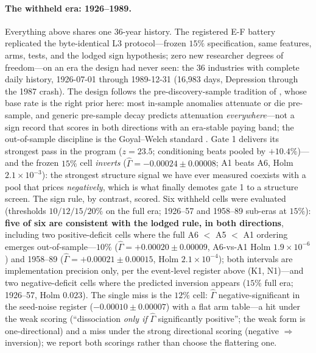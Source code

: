 \documentclass{article}
\begin{document}
\paragraph{The withheld era: 1926--1989.} Everything above shares one
36-year history. The registered E-F battery replicated the
byte-identical L3 protocol---frozen $15\%$ specification, same
features, arms, tests, and the lodged sign hypothesis; zero new
researcher degrees of freedom---on an era the design had never seen:
the 36 industries with complete daily history, 1926-07-01 through
1989-12-31 (16{,}983 days, Depression through the 1987 crash). The
design follows the pre-discovery-sample tradition of
\citet{linnainmaa2018history}, whose base rate is the right prior
here: most in-sample anomalies attenuate or die pre-sample, and
generic pre-sample decay predicts attenuation \emph{everywhere}---not
a sign record that scores in both directions with an era-stable
paying band; the out-of-sample discipline is
the Goyal--Welch standard \citep{goyal2008comprehensive,
mclean2016does}. Gate 1
delivers its strongest pass in the program ($z = 23.5$; conditioning
beats pooled by $+10.4\%$)---and the frozen $15\%$ cell
\emph{inverts} ($\hat\Gamma = -0.00024 \pm 0.00008$; A1 beats A6,
Holm $2.1\times10^{-3}$): the strongest structure signal we have ever
measured coexists with a pool that prices \emph{negatively}, which is
what finally demotes gate 1 to a structure screen. The sign rule, by
contrast, scored. Six withheld cells were evaluated (thresholds
$10/12/15/20\%$ on the full era; 1926--57 and 1958--89 sub-eras at
$15\%$): \textbf{five of six are consistent with the lodged rule, in
both directions}, including two positive-deficit cells where the full
A6 $<$ A5 $<$ A1 ordering emerges out-of-sample---$10\%$
($\hat\Gamma = +0.00020 \pm 0.00009$, A6-vs-A1 Holm
$1.9\times10^{-6}$) and 1958--89 ($\hat\Gamma = +0.00021 \pm 0.00015$,
Holm $2.1\times10^{-4}$); both intervals are implementation
precision only, per the event-level register above (K1,
N1)---and two negative-deficit cells where the
predicted inversion appears ($15\%$ full era; 1926--57, Holm $0.023$).
The single miss is the $12\%$ cell: $\hat\Gamma$ negative-significant
in the seed-noise register ($-0.00010 \pm 0.00007$) with a flat arm
table---a hit under the weak scoring (``dissociation
\emph{only if} $\hat\Gamma$ significantly positive''; the weak form is
one-directional) and a miss under the strong
directional scoring (negative $\Rightarrow$ inversion); we report both
scorings rather than choose the flattering one.
\end{document}
